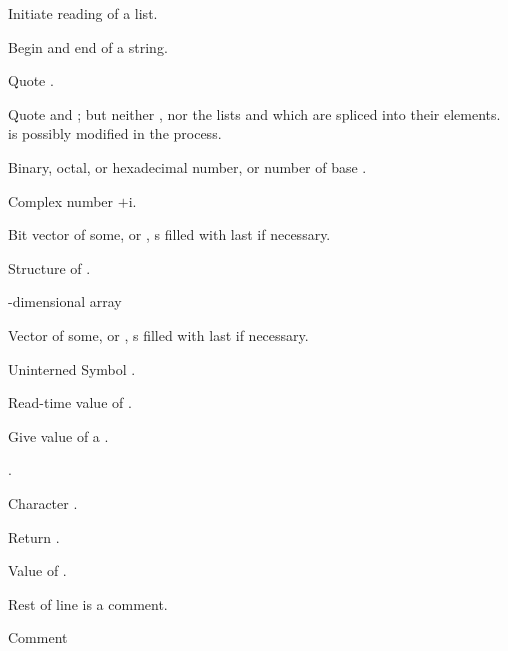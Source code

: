 \begin{LIST}{1cm}

  \IT{\KWD*{(}}
  Initiate reading of a list.

  Begin and end of a string.

   Quote .

  Quote  and ; but neither , nor the lists
   and  which are spliced into their
  elements.  is possibly modified in the process.

   Binary, octal, or hexadecimal
  number, or number of base .

   Complex number $+$i.

  \index{\#*}%
  Bit vector of some, or ,
  s filled with last  if necessary.

  Structure of .

  -dimensional array

  \index{\#(}%
  Vector of some, or ,
  s filled with last  if necessary.

   Uninterned Symbol .

   Read-time value of .

   Give value of  a .
  \index{\#=}%

   .
  \index{\#\#}%

   Character .

   Return .

   Value of .

   Rest of line is a comment.

   Comment


\end{LIST}
